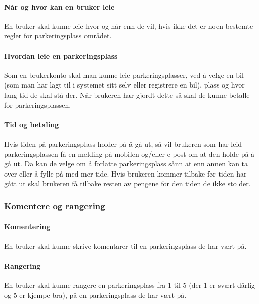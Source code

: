\documentclass[12pt]{article}
\begin{document}
            \paragraph{Når og hvor kan en bruker leie}
            En bruker skal kunne leie hvor og når enn de vil, hvis ikke det er noen bestemte regler for parkeringsplass området.

            \paragraph{Hvordan leie en parkeringsplass}
            Som en brukerkonto skal man kunne leie parkeringsplasser, ved å velge en bil (som man har lagt til i systemet sitt selv eller registrere en bil), plass og hvor lang tid de skal stå der. Når brukeren har gjordt dette så skal de kunne betalle for parkeringsplassen.

            \paragraph{Tid og betaling}
            Hvis tiden på parkeringsplass holder på å gå ut, så vil brukeren som har leid parkeringsplassen få en melding på mobilen og/eller e-post om at den holde på å gå ut. Da kan de velge om å forlatte parkeringsplass sånn at enn annen kan ta over eller å fylle på med mer tide. Hvis brukeren kommer tilbake før tiden har gått ut skal brukeren få tilbake resten av pengene for den tiden de ikke sto der.

        \subsubsection{Komentere og rangering}

            \paragraph{Komentering}
            En bruker skal kunne skrive komentarer til en parkeringsplass de har vært på. 

            \paragraph{Rangering}
            En bruker skal kunne rangere en parkeringsplass fra 1 til 5 (der 1 er svært dårlig og 5 er kjempe bra), på en parkeringsplass de har vært på.
\end{document}
